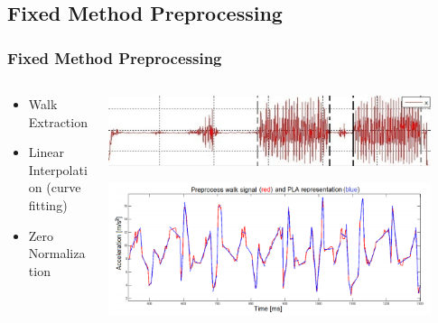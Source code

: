 \documentclass{beamer}
\begin{document}
\subsection{Fixed Method Preprocessing}
\begin{frame}
  \frametitle{Fixed Method Preprocessing}
  \begin{columns}
  \begin{column}{0.4\textwidth}
  \begin{itemize}
    \item Walk Extraction 
  	\linebreak
  	\item Linear Interpolation (curve fitting)
  	\linebreak
	\item Zero Normalization 
  \end{itemize}
  \end{column}  
  
\begin{column}{0.5\textwidth}

\includegraphics[width=0.91\textwidth]{Illustrations/onegaitcycle.png}

\includegraphics[width=0.91\textwidth]{Illustrations/linear.png}

\end{column}   
  
  \end{columns}
\end{frame}
\end{document}
